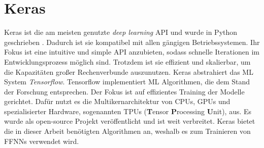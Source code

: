 \section{Keras}
Keras ist die am meisten genutzte \textit{deep learning} API und wurde in Python geschrieben \cite{kerasDoc}.
Dadurch ist sie kompatibel mit allen gängigen Betriebssystemen.
Ihr Fokus ist eine intuitive und simple API anzubieten, sodass schnelle Iterationen im Entwicklungsprozess möglich sind.
Trotzdem ist sie effizient und skalierbar, um die Kapazitäten großer Rechenverbunde auszunutzen.
\newline
\newline
Keras abstrahiert das ML System \textit{Tensorflow}. Tensorflow implementiert ML Algorithmen, die dem Stand der Forschung entsprechen.
Der Fokus ist auf effizientes Training der Modelle \cite{abadi2016tensorflow} gerichtet.
Dafür nutzt es die Multikernarchitektur von CPUs, GPUs und spezialisierter Hardware, sogenannten TPUs (\textbf{T}ensor \textbf{P}rocessing \textbf{U}nit), aus.
Es wurde als open-source Projekt veröffentlicht und ist weit verbreitet.
\newline
\newline
Keras bietet die in dieser Arbeit benötigten Algorithmen an, weshalb es zum Trainieren von FFNNs verwendet wird.